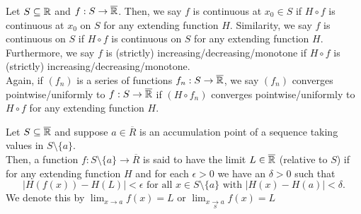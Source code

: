 \begin{definition}
	Let \(S \subseteq \mathbb{R}\) and \(f : S \to \overline{\mathbb{R}}\). Then, we say \(f\) is continuous at \(x_0 \in S\) if \(H \circ f\) is continuous at \(x_0\) on \(S\) for any extending function \(H\). Similarity, we say \(f\) is continuous on \(S\) if \(H \circ f\) is continuous on \(S\) for any extending function \(H\).\\
	Furthermore, we say \(f\) is (strictly) increasing/decreasing/monotone if \(H \circ f\) is (strictly) increasing/decreasing/monotone.\\
	Again, if \(\left( f_{n} \right) \) is a series of functions \(f_{n} : S \to \overline{\mathbb{R}}\), we say \(\left( f_{n} \right) \) converges pointwise/uniformly to \(f:S \to \overline{\mathbb{R}}\) if \(\left( H \circ f_{n} \right) \) converges pointwise/uniformly to \(H \circ f\) for any extending function \(H\).
\end{definition}
\begin{definition}
	Let \(S \subseteq \overline{\mathbb{R}}\) and suppose  \(a \in \overline{R}\) is an accumulation point of a sequence taking values in \(S \setminus \{a\} \).\\
	Then, a function \(f : S \setminus \{a\} \to \overline{R}\) is said to have the limit \(L \in \overline{\mathbb{R}}\) (relative to \(S\)) if for any extending function \(H\) and for each \(\epsilon > 0\) we have an \(\delta > 0\) such that \[
		\left| H\left( f\left( x \right)  \right) - H\left( L  \right)  \right| < \epsilon \text{ for all \(x \in S \setminus \{a\} \) with } \left| H\left( x \right) - H\left( a \right)   \right| < \delta
	.\]
	We denote this by \(\lim_{x \to a} f\left( x \right) = L\) or \(\lim_{\underset{S}{x \to a} } f\left( x \right) = L\)
\end{definition}
